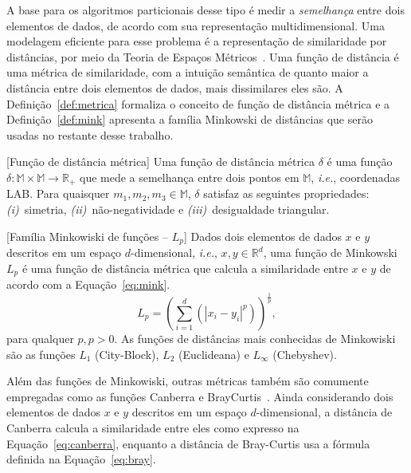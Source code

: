 A base para os algoritmos particionais desse tipo é medir a \textit{semelhança} entre dois elementos de dados, de acordo com sua representação multidimensional.
Uma modelagem eficiente para esse problema é a representação de similaridade por distâncias, por meio da Teoria de Espaços Métricos~\cite{Hetland2009}.
Uma função de distância é uma métrica de similaridade, com a intuição semântica de quanto maior a distância entre dois elementos de dados, mais dissimilares eles são.
A Definição~\ref{def:metrica} formaliza o conceito de função de distância métrica e a Definição~\ref{def:mink} apresenta a família Minkowski de distâncias que serão usadas no restante desse trabalho.

\begin{definition}\label{def:metrica}[Função de distância métrica]
Uma função de distância métrica $\delta$ é uma função $\delta: \mathbb{M} \times \mathbb{M} \rightarrow \mathbb{R}_{+}$ que mede a semelhança entre dois pontos em $\mathbb{M}$, \textit{i.e.}, coordenadas LAB.
Para quaisquer $m_1, m_2, m_3 \in \mathbb{M}$, $\delta$ satisfaz as seguintes propriedades: 
\textit{(i)}~simetria,
\textit{(ii)}~não-negatividade e  
\textit{(iii)}~desigualdade triangular.
\end{definition}

\begin{definition}\label{def:mink}[Família Minkowiski de funções -- $L_p$]
Dados dois elementos de dados $x$ e $y$ descritos em um espaço $d$-dimensional, \textit{i.e.}, $x, y \in \mathbb{R}^d$, uma função de Minkowski $L_p$ é uma função de distância métrica que calcula a similaridade entre $x$ e $y$ de acordo com a Equação~\ref{eq:mink}.
\begin{equation}\label{eq:mink}
    L_p = \left(\sum_{i = 1}^{d}\left(|x_i - y_i|^p\right)\right)^\frac{1}{p},
\end{equation}
para qualquer $p, p > 0$.
As funções de distâncias mais conhecidas de Minkowiski são as funções $L_1$ (City-Block), $L_2$ (Euclideana) e $L_\infty$ (Chebyshev).
\end{definition}

Além das funções de Minkowiski, outras métricas também são comumente empregadas como as funções Canberra e BrayCurtis~\cite{Hetland2009,Blanco2016}.
Ainda considerando  dois elementos de dados $x$ e $y$ descritos em um espaço $d$-dimensional, a distância de Canberra calcula a similaridade entre eles como expresso na Equação~\ref{eq:canberra}, enquanto a distância de Bray-Curtis usa a fórmula definida na Equação~\ref{eq:bray}.

